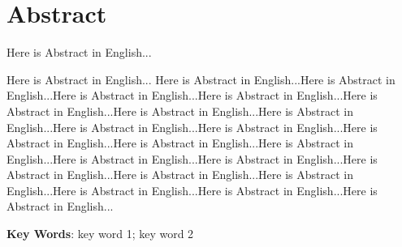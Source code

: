 \section*{ Abstract}

Here is Abstract in English...

Here is Abstract in English...
Here is Abstract in English...Here is Abstract in English...Here is Abstract in English...Here is Abstract in English...Here is Abstract in English...Here is Abstract in English...Here is Abstract in English...Here is Abstract in English...Here is Abstract in English...Here is Abstract in English...Here is Abstract in English...Here is Abstract in English...Here is Abstract in English...Here is Abstract in English...Here is Abstract in English...Here is Abstract in English...Here is Abstract in English...Here is Abstract in English...Here is Abstract in English...Here is Abstract in English...

\noindent
\textbf{Key Words}:
key word 1; key word 2
\indent 